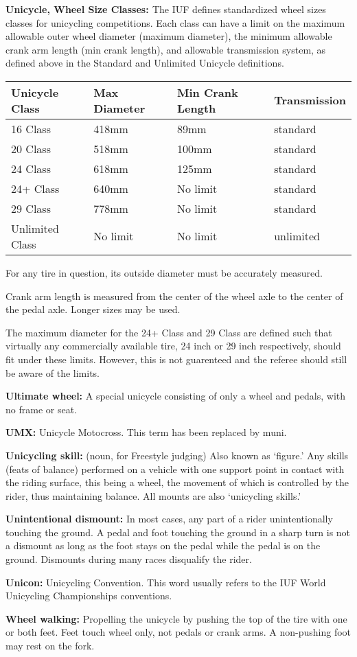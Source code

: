 \textbf{Unicycle, Wheel Size Classes: \label{def:general_terminology_wheel-size-classes}}
The IUF defines standardized wheel sizes classes for unicycling competitions. Each class can have a limit on the maximum allowable outer wheel diameter (maximum diameter), the minimum allowable crank arm length (min crank length), and allowable transmission system, as defined above in the Standard and Unlimited Unicycle definitions.

\begin{longtable}{|p{3cm}|p{3cm}|p{4cm}|p{3cm}|}
\hline
\textbf{Unicycle Class} & \textbf{Max Diameter} & \textbf{Min Crank Length} & \textbf{Transmission}\\
\hline
16 Class & 418mm & 89mm & standard \\
\hline
20 Class & 518mm & 100mm & standard \\
\hline
24 Class & 618mm & 125mm & standard \\
\hline
24+ Class & 640mm & No limit & standard \\
\hline
29 Class & 778mm & No limit & standard \\
\hline
Unlimited Class & No limit & No limit & unlimited \\
\hline
\end{longtable}

For any tire in question, its outside diameter must be accurately measured.

Crank arm length is measured from the center of the wheel axle to the center of the pedal axle.
Longer sizes may be used.

The maximum diameter for the 24+ Class and 29 Class are defined such that virtually any commercially available tire, 24 inch or 29 inch respectively, should fit under these limits. However, this is not guarenteed and the referee should still be aware of the limits.

\textbf{Ultimate wheel:} A special unicycle consisting of only a wheel and pedals, with no frame or seat.

\textbf{UMX:} Unicycle Motocross.
This term has been replaced by muni.

\textbf{Unicycling skill:} (noun, for Freestyle judging) Also known as `figure.' Any skills (feats of balance) performed on a vehicle with one support point in contact with the riding surface, this being a wheel, the movement of which is controlled by the rider, thus maintaining balance.
All mounts are also `unicycling skills.'

\textbf{Unintentional dismount:} In most cases, any part of a rider unintentionally touching the ground.
A pedal and foot touching the ground in a sharp turn is not a dismount as long as the foot stays on the pedal while the pedal is on the ground.
Dismounts during many races disqualify the rider.

\textbf{Unicon:} Unicycling Convention.
This word usually refers to the IUF World Unicycling Championships conventions.

\textbf{Wheel walking:} Propelling the unicycle by pushing the top of the tire with one or both feet.
Feet touch wheel only, not pedals or crank arms.
A non-pushing foot may rest on the fork.
